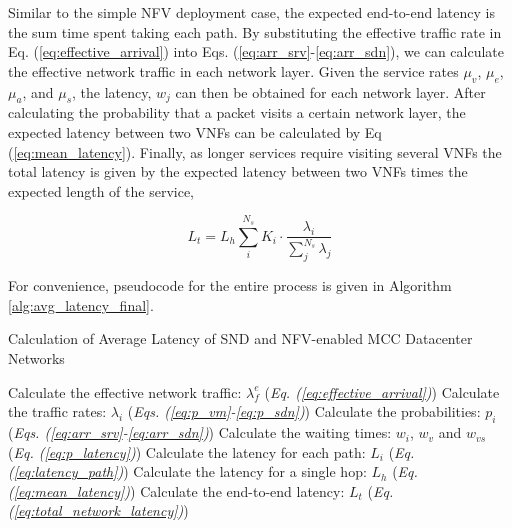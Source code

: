 Similar to the simple NFV deployment case, the expected end-to-end latency is the sum time spent taking each path. By substituting the effective traffic rate in Eq. (\ref{eq:effective_arrival}) into Eqs. (\ref{eq:arr_srv}-\ref{eq:arr_sdn}), we can calculate the effective network traffic in each network layer. Given the service rates $\mu_v$, $\mu_e$, $\mu_a$, and $\mu_s$, the latency, $w_j$ can then be obtained for each network layer. After calculating the probability that a packet visits a certain network layer, the expected latency between two VNFs can be calculated by Eq (\ref{eq:mean_latency}). Finally, as longer services require visiting several VNFs the total latency is given by the expected latency between two VNFs times the expected length of the service,

\begin{equation}
    \label{eq:total_network_latency}
    L_t = L_h \sum_i^{N_s} K_i \cdot \frac{\lambda_i}{\sum_j^{N_s} \lambda_j}
\end{equation}

For convenience, pseudocode for the entire process is given in Algorithm \ref{alg:avg_latency_final}.

\begin{algorithm}

    \caption{Calculation of Average Latency of SND and NFV-enabled MCC Datacenter Networks}
    \label{alg:avg_latency_final}

    \begin{algorithmic}[1]
        \STATE Calculate the effective network traffic: $\lambda_f^e$ \hfill(\textit{Eq. (\ref{eq:effective_arrival})})
        \STATE Calculate the traffic rates: $\lambda_i$ \hfill(\textit{Eqs. (\ref{eq:p_vm}-\ref{eq:p_sdn})})
        \STATE Calculate the probabilities: $p_i$ \hfill(\textit{Eqs. (\ref{eq:arr_srv}-\ref{eq:arr_sdn})})
        \STATE Calculate the waiting times: $w_i$, $w_v$ and $w_{vs}$ \hfill(\textit{Eq. (\ref{eq:p_latency})})
        \STATE Calculate the latency for each path: $L_i$ \hfill (\textit{Eq. (\ref{eq:latency_path})})
        \STATE Calculate the latency for a single hop: $L_h$ \hfill (\textit{Eq. (\ref{eq:mean_latency})})
        \STATE Calculate the end-to-end latency: $L_t$ \hfill (\textit{Eq. (\ref{eq:total_network_latency})})
    \end{algorithmic}
\end{algorithm}